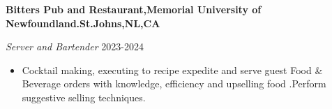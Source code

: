 \textbf{Bitters Pub and Restaurant,Memorial University of Newfoundland.\hfill St.Johns,NL,CA}\par

\textit{Server and Bartender } \hfill 2023-2024
\begin{itemize}
	\item Cocktail making, executing to recipe expedite and serve guest Food & Beverage orders with knowledge,
efficiency and upselling food .Perform suggestive selling
techniques.
\end{itemize}\par